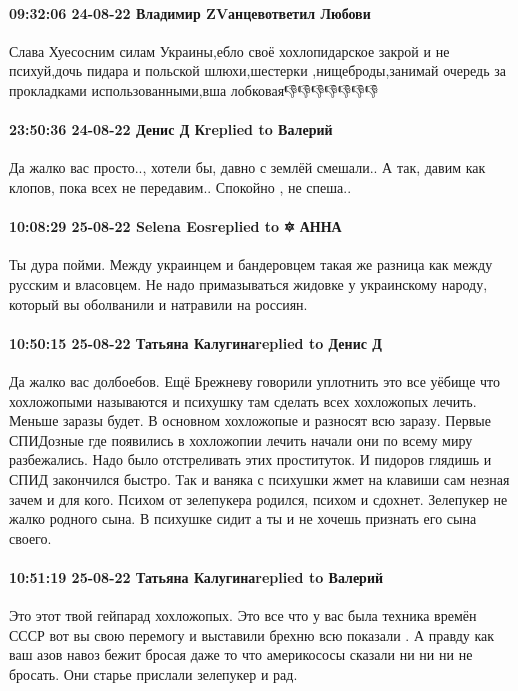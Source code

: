 \paragraph{09:32:06 24-08-22 Владимир ZVанцевответил Любови}

Слава Хуесосним силам Украины,ебло своё хохлопидарское закрой и не психуй,дочь
пидара и польской шлюхи,шестерки ,нищеброды,занимай очередь за прокладками
использованными,вша лобковая👎👎👎👎👎👎👎

\paragraph{23:50:36 24-08-22 Денис Д Кreplied to Валерий}

Да жалко вас просто.., хотели бы, давно с землёй смешали.. А так, давим как
клопов, пока всех не передавим.. Спокойно , не спеша..

\paragraph{10:08:29 25-08-22 Selena Eosreplied to 🔯 АННА}

Ты дура пойми. Между украинцем и бандеровцем такая же разница как между русским
и власовцем. Не надо примазываться жидовке у украинскому народу, который вы
оболванили и натравили на россиян.

\paragraph{10:50:15 25-08-22 Татьяна Калугинаreplied to Денис Д}

Да жалко вас долбоебов. Ещё Брежневу говорили уплотнить это все уёбище что
хохложопыми называются и психушку там сделать всех хохложопых лечить. Меньше
заразы будет. В основном хохложопые и разносят всю заразу. Первые СПИДозные где
появились в хохложопии лечить начали они по всему миру разбежались. Надо было
отстреливать этих проституток. И пидоров глядишь и СПИД закончился быстро. Так
и ваняка с психушки жмет на клавиши сам незная зачем и для кого. Психом от
зелепукера родился, психом и сдохнет. Зелепукер не жалко родного сына. В
психушке сидит а ты и не хочешь признать его сына своего.

\paragraph{10:51:19 25-08-22 Татьяна Калугинаreplied to Валерий}

Это этот твой гейпарад хохложопых. Это все что у вас была техника времён СССР
вот вы свою перемогу и выставили брехню всю показали . А правду как ваш азов
навоз бежит бросая даже то что америкососы сказали ни ни ни не бросать. Они
старье прислали зелепукер и рад.

